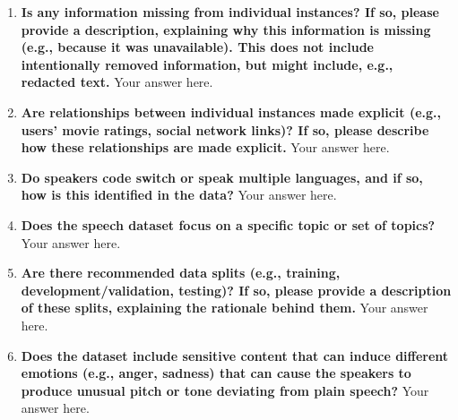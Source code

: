 \documentclass{article}
\begin{document}
\begin{enumerate}[leftmargin=0.65cm]
        \item \textbf{Is any information missing from individual instances? If so, please provide a description, explaining why this information is missing (e.g., because it was unavailable). This does not include intentionally removed information, but might include, e.g., redacted text.}
        \newline 
        Your answer here.
        \newline 
        
        \item \textbf{Are relationships between individual instances made explicit (e.g., users’ movie ratings, social network links)? If so, please describe how these relationships are made explicit.}
        \newline 
        Your answer here.
        \newline 
        
        \item \textbf{Do speakers code switch or speak multiple languages, and if so, how is this identified in the data?}
        \newline 
        Your answer here.
        \newline 
        
        \item \textbf{Does the speech dataset focus on a specific topic or set of topics?}
        \newline 
        Your answer here.
        \newline 
        
        \item \textbf{Are there recommended data splits (e.g., training, development/validation, testing)? If so, please provide a description of these splits, explaining the rationale behind them.}
        \newline 
        Your answer here.
        \newline 
        
        \item \textbf{Does the dataset include sensitive content that can induce different emotions (e.g., anger, sadness) that can cause the speakers to produce unusual pitch or tone deviating from plain speech?}
        \newline 
        Your answer here.
        \newline 
        

\end{enumerate}
\end{document}
